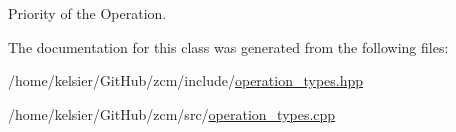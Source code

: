 Priority of the Operation. 



The documentation for this class was generated from the following files\-:\begin{DoxyCompactItemize}
\item 
/home/kelsier/\-Git\-Hub/zcm/include/\hyperlink{operation__types_8hpp}{operation\-\_\-types.\-hpp}\item 
/home/kelsier/\-Git\-Hub/zcm/src/\hyperlink{operation__types_8cpp}{operation\-\_\-types.\-cpp}\end{DoxyCompactItemize}

